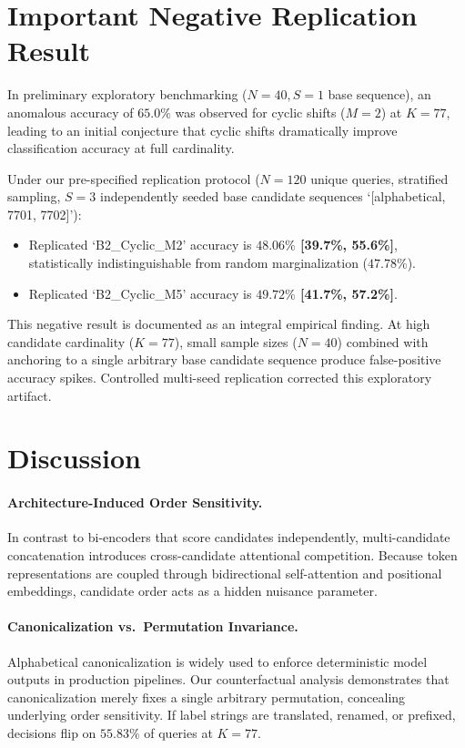 \documentclass[11pt,a4paper]{article}
\begin{document}
\section{Important Negative Replication Result}

In preliminary exploratory benchmarking ($N=40, S=1$ base sequence), an anomalous accuracy of \textbf{$65.0\%$} was observed for cyclic shifts ($M=2$) at $K=77$, leading to an initial conjecture that cyclic shifts dramatically improve classification accuracy at full cardinality.

Under our pre-specified replication protocol ($N=120$ unique queries, stratified sampling, $S=3$ independently seeded base candidate sequences `[alphabetical, 7701, 7702]'):
\begin{itemize}
    \item Replicated `B2\_Cyclic\_M2' accuracy is \textbf{$48.06\%$ [39.7\%, 55.6\%]}, statistically indistinguishable from random marginalization ($47.78\%$).
    \item Replicated `B2\_Cyclic\_M5' accuracy is \textbf{$49.72\%$ [41.7\%, 57.2\%]}.
\end{itemize}
This negative result is documented as an integral empirical finding. At high candidate cardinality ($K=77$), small sample sizes ($N=40$) combined with anchoring to a single arbitrary base candidate sequence produce false-positive accuracy spikes. Controlled multi-seed replication corrected this exploratory artifact.

\section{Discussion}

\paragraph{Architecture-Induced Order Sensitivity.}
In contrast to bi-encoders that score candidates independently, multi-candidate concatenation introduces cross-candidate attentional competition. Because token representations are coupled through bidirectional self-attention and positional embeddings, candidate order acts as a hidden nuisance parameter.

\paragraph{Canonicalization vs.\ Permutation Invariance.}
Alphabetical canonicalization is widely used to enforce deterministic model outputs in production pipelines. Our counterfactual analysis demonstrates that canonicalization merely fixes a single arbitrary permutation, concealing underlying order sensitivity. If label strings are translated, renamed, or prefixed, decisions flip on $55.83\%$ of queries at $K=77$.
\end{document}
